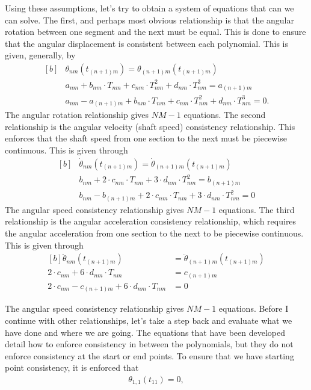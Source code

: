 \documentclass{article}
\begin{document}
	Using these assumptions, let's try to obtain a system of equations that can we can solve. The first, and perhaps most obvious relationship is that the angular rotation between one segment and the next must be equal. This is done to ensure that the angular displacement is consistent between each polynomial. This is given, generally, by
	\begin{equation}
		\begin{aligned}[b]
			&\theta_{nm}(t_{(n+1)m}) = \theta_{(n+1)m}(t_{(n + 1)m}) \\
			&a_{nm} + b_{nm}\cdot T_{nm} + c_{nm}\cdot T_{nm}^2 + d_{nm}\cdot T_{nm}^3 = a_{(n+1)m} \\
			&a_{nm} - a_{(n+1)m} + b_{nm}\cdot T_{nm} + c_{nm}\cdot T_{nm}^2 + d_{nm}\cdot T_{nm}^3 = 0.
		\end{aligned}
	\end{equation}
	The angular rotation relationship gives $NM-1$ equations. The second relationship is the angular velocity (shaft speed) consistency relationship. This enforces that the shaft speed from one section to the next must be piecewise continuous. This is given through
	\begin{equation}
	\begin{aligned}[b]
		&\dot{\theta}_{nm}(t_{(n+1)m}) = \dot{\theta}_{(n+1)m}(t_{(n + 1)m}) \\
		&b_{nm} + 2 \cdot c_{nm}\cdot T_{nm} + 3 \cdot d_{nm}\cdot T_{nm}^2 = b_{(n+1)m} \\
		&b_{nm} - b_{(n+1)m} + 2 \cdot c_{nm}\cdot T_{nm} + 3 \cdot d_{nm}\cdot T_{nm}^2 = 0
	\end{aligned}
	\end{equation}
	The angular speed consistency relationship gives $NM-1$ equations. The third relationship is the angular acceleration consistency relationship, which requires the angular acceleration from one section to the next to be piecewise continuous. This is given through
	\begin{equation}
		\begin{aligned}[b]
			\ddot{\theta}_{nm}(t_{(n+1)m}) &= \ddot{\theta}_{(n+1)m}(t_{(n + 1)m}) \\
			2 \cdot c_{nm} + 6 \cdot d_{nm}\cdot T_{nm} &= c_{(n+1)m} \\
			2 \cdot c_{nm} - c_{(n+1)m} + 6 \cdot d_{nm}\cdot T_{nm} &= 0 
		\end{aligned}
	\end{equation}

	The angular speed consistency relationship gives $NM-1$ equations. Before I continue with other relationships, let's take a step back and evaluate what we have done and where we are going. The equations that have been developed detail how to enforce consistency in between the polynomials, but they do not enforce consistency at the start or end points. To ensure that we have starting point consistency, it is enforced that 
	\begin{equation}
		\begin{aligned}
		\theta_{1, 1}(t_{11}) = 0,
		\end{aligned}
	\end{equation} 
	
\end{document}
